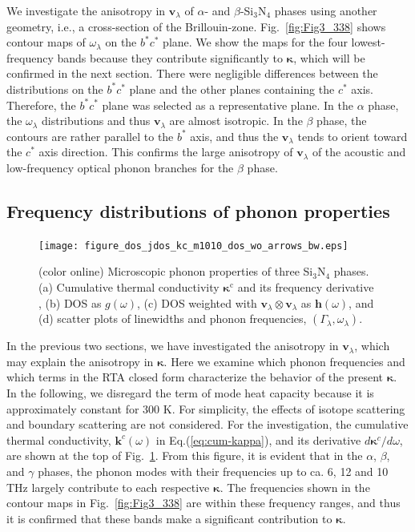 \documentclass[twocolumn,amsmath,amssymb,a4paper,prb,superscriptaddress,floatfix]{revtex4-1}
\begin{document}
We investigate the anisotropy in $\mathbf{v}_{\lambda}$ of $\alpha$- and
$\beta$-Si$_3$N$_4$ phases using another geometry, i.e., a cross-section of the
Brillouin-zone. Fig.~\ref{fig:Fig3_338} shows contour maps of
$\omega_{\lambda}$  on the $b^*c^*$ plane.  We show the maps for the four
lowest-frequency bands because they contribute significantly to 
$\boldsymbol{\kappa}$, which will be confirmed in the next section. There were
negligible differences between the distributions on the $b^*c^*$ plane and the
other planes containing the $c^*$ axis.  Therefore, the $b^*c^*$ plane was
selected as a
representative plane. In the $\alpha$ phase, the $\omega_{\lambda}$ distributions and
thus $\mathbf{v}_{\lambda}$ are almost isotropic. In the $\beta$ phase, the
contours are rather parallel to the $b^*$ axis, and thus the
$\mathbf{v}_{\lambda}$ tends to orient toward the $c^*$ axis direction. This
confirms the large anisotropy of $\mathbf{v}_{\lambda}$ 
of the acoustic and low-frequency optical phonon branches for the $\beta$ phase.

\subsection{Frequency distributions of phonon properties}

\begin{figure}[ht]
 \begin{center}
	 \texttt{[image: figure\_dos\_jdos\_kc\_m1010\_dos\_wo\_arrows\_bw.eps]}
  \caption{(color online) Microscopic phonon properties of three Si$_3$N$_4$
	  phases. (a) Cumulative thermal conductivity $\boldsymbol{\kappa}^\text{c}$ and
	  its frequency derivative
	  , (b) DOS as $g(\omega)$, (c) DOS weighted with $\mathbf{v}_\lambda \otimes
	  \mathbf{v}_\lambda$ as $\boldsymbol{h}(\omega)$, and (d) scatter plots of
	  linewidths and phonon frequencies, $(\Gamma_\lambda,\omega_\lambda)$.
  \label{fig:Fig5_338_rev} }
 \end{center}
\end{figure}

In the previous two sections, we have investigated the anisotropy in
$\mathbf{v}_\lambda$, which may explain the anisotropy in $\boldsymbol{\kappa}$.
Here we examine which phonon frequencies and which terms in the RTA closed form
characterize the behavior of the present $\boldsymbol{\kappa}$. In the
following, we disregard the term of mode heat capacity because it is
approximately constant for 300 K.  For simplicity, the effects of isotope
scattering and boundary scattering are not considered.  For the investigation,
the cumulative thermal conductivity, $\boldsymbol{k}^c(\omega)$ in
Eq.(\ref{eq:cum-kappa}), and its derivative $d\boldsymbol{\kappa}^c/d\omega$,
are shown at the top of Fig.~\ref{fig:Fig5_338_rev}. From this figure, it is
evident that in the $\alpha$, $\beta$, and $\gamma$ phases, the phonon modes
with their frequencies up to ca. 6, 12 and 10 THz largely contribute to each
respective $\boldsymbol{\kappa}$. The frequencies shown in the contour maps in
Fig.~\ref{fig:Fig3_338} are within these frequency ranges, and thus it is
confirmed that these bands make a significant contribution to
$\boldsymbol{\kappa}$.  
\end{document}
